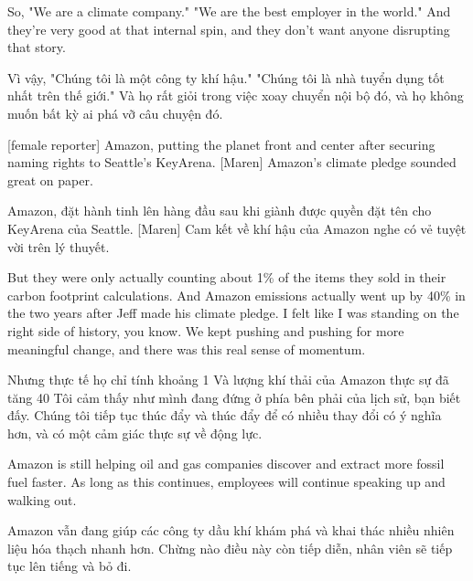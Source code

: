 \documentclass[a4paper]{article}
\begin{document}
	So, "We are a climate company." "We are the best employer in the world."
	And they're very good at that internal spin, and they don't want anyone disrupting that story.
	
	\begin{vietnamese-v2}
		Vì vậy, "Chúng tôi là một công ty khí hậu." "Chúng tôi là nhà tuyển dụng tốt nhất trên thế giới."
		Và họ rất giỏi trong việc xoay chuyển nội bộ đó, và họ không muốn bất kỳ ai phá vỡ câu chuyện đó.
	\end{vietnamese-v2}
	
	[female reporter] Amazon, putting the planet front and center after securing naming rights to Seattle's KeyArena.
	[Maren] Amazon's climate pledge sounded great on paper.
	
	\begin{vietnamese-v2}
		 Amazon, đặt hành tinh lên hàng đầu sau khi giành được quyền đặt tên cho KeyArena của Seattle.
		[Maren] Cam kết về khí hậu của Amazon nghe có vẻ tuyệt vời trên lý thuyết.
	\end{vietnamese-v2}
	
	But they were only actually counting about 1\% of the items they sold in their carbon footprint calculations.
	And Amazon emissions actually went up by 40\% in the two years after Jeff made his climate pledge.
	I felt like I was standing on the right side of history, you know.
	We kept pushing and pushing for more meaningful change, and there was this real sense of momentum.
	
	\begin{vietnamese-v2}
		Nhưng thực tế họ chỉ tính khoảng 1%
		Và lượng khí thải của Amazon thực sự đã tăng 40%
		Tôi cảm thấy như mình đang đứng ở phía bên phải của lịch sử, bạn biết đấy.
		Chúng tôi tiếp tục thúc đẩy và thúc đẩy để có nhiều thay đổi có ý nghĩa hơn, và có một cảm giác thực sự về động lực.
	\end{vietnamese-v2}
	
	Amazon is still helping oil and gas companies discover and extract more fossil fuel faster.
	As long as this continues, employees will continue speaking up and walking out.
	
	\begin{vietnamese-v2}
		Amazon vẫn đang giúp các công ty dầu khí khám phá và khai thác nhiều nhiên liệu hóa thạch nhanh hơn.
		Chừng nào điều này còn tiếp diễn, nhân viên sẽ tiếp tục lên tiếng và bỏ đi.
	\end{vietnamese-v2}
	
\end{document}
